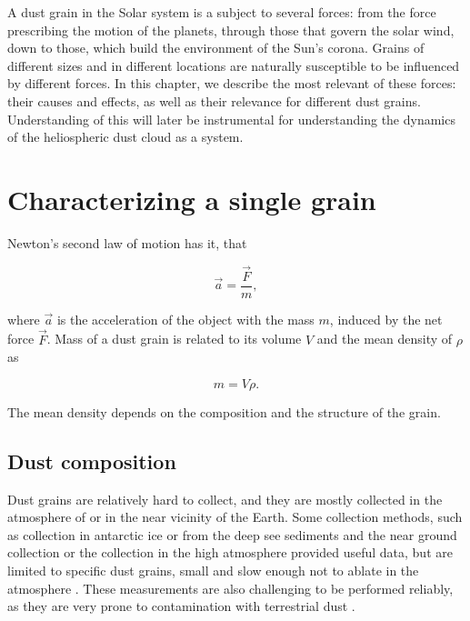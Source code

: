 A dust grain in the Solar system is a subject to several forces: from the force prescribing the motion of the planets, through those that govern the solar wind, down to those, which build the environment of the Sun's corona. Grains of different sizes and in different locations are naturally susceptible to be influenced by different forces. In this chapter, we describe the most relevant of these forces: their causes and effects, as well as their relevance for different dust grains. Understanding of this will later be instrumental for understanding the dynamics of the heliospheric dust cloud as a system.

\section{Characterizing a single grain}

Newton's second law of motion has it, that

\begin{equation}
\vec{a} = \frac{\vec{F}}{m},
\end{equation}

where $\vec{a}$ is the acceleration of the object with the mass $m$, induced by the net force $\vec{F}$. Mass of a dust grain is related to its volume $V$ and the mean density of $\rho$ as

\begin{equation}
    m = V \rho.
\end{equation}

The mean density depends on the composition and the structure of the grain. 

\subsection{Dust composition}

Dust grains are relatively hard to collect, and they are mostly collected in the atmosphere of or in the near vicinity of the Earth. Some collection methods, such as collection in antarctic ice or from the deep see sediments \citep{brownlee1985cosmic} and the near ground collection \citep{pettersson1958rate} or the collection in the high atmosphere \citep{fechtig1968results} provided useful data, but are limited to specific dust grains, small and slow enough not to ablate in the atmosphere \cite{vondrak2008chemical}. These measurements are also challenging to be performed reliably, as they are very prone to contamination with terrestrial dust \citep{taylor2016cosmic}. 

